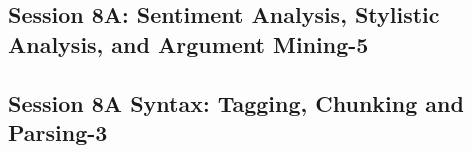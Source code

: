 \subsection{\large Session 8A: Sentiment Analysis, Stylistic Analysis, and Argument Mining-5}
\label{parallel-session-8A-trackH}
\TrackHLoc\hfill\sessionchair{}{}
\clearpage
\subsection{\large Session 8A Syntax: Tagging, Chunking and Parsing-3}
\label{parallel-session-8A-trackI}
\TrackILoc\hfill\sessionchair{}{}
\clearpage


